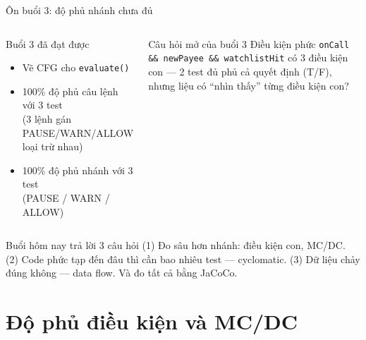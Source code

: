 \documentclass[aspectratio=169,12pt]{beamer}
\begin{document}
\begin{frame}{Ôn buổi 3: độ phủ nhánh chưa đủ}
  \begin{columns}[T]
    \begin{block}{Buổi 3 đã đạt được}
      \begin{itemize}
        \item Vẽ CFG cho \texttt{evaluate()}
        \item 100\% độ phủ câu lệnh với 3 test\\
              (3 lệnh gán PAUSE/WARN/ALLOW loại trừ nhau)
        \item 100\% độ phủ nhánh với 3 test\\
              (PAUSE / WARN / ALLOW)
      \end{itemize}
    \end{block}

    \begin{alertblock}{Câu hỏi mở của buổi 3}
      Điều kiện phức \texttt{onCall \&\& newPayee \&\& watchlistHit}
      có 3 điều kiện con --- 2 test đủ phủ cả quyết định (T/F),
      nhưng liệu có ``nhìn thấy'' từng điều kiện con?
    \end{alertblock}
  \end{columns}

  \vspace{0.4em}
  \begin{exampleblock}{Buổi hôm nay trả lời 3 câu hỏi}
    (1) Đo sâu hơn nhánh: điều kiện con, MC/DC.
    (2) Code phức tạp đến đâu thì cần bao nhiêu test --- cyclomatic.
    (3) Dữ liệu chảy đúng không --- data flow. Và đo tất cả bằng JaCoCo.
  \end{exampleblock}
\end{frame}

\section{Độ phủ điều kiện và MC/DC}
\end{document}
